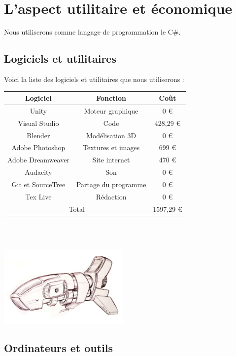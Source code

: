 \documentclass[10pt, titlepage]{report}
\begin{document}
\chapter{L'aspect utilitaire et économique}

Nous utiliserons comme langage de programmation le C\#.

\section{Logiciels et utilitaires}

Voici la liste des logiciels et utilitaires que nous utiliserons :\\

\begin{tabular}{|c|c|c|}
\hline
Logiciel & Fonction & Coût\\
\hline
Unity & Moteur graphique & 0 \euro\\
\hline
Visual Studio & Code & 428,29 \euro\\
\hline
Blender & Modélisation 3D & 0 \euro\\
\hline
Adobe Photoshop & Textures et images & 699 \euro\\
\hline
Adobe Dreamweaver & Site internet & 470 \euro\\
\hline
Audacity & Son & 0 \euro\\
\hline
Git et SourceTree & Partage du programme & 0 \euro\\
\hline
Tex Live & Rédaction & 0 \euro\\
\hline
\multicolumn{2}{|c|}{Total } & 1597,29 \euro\\
\hline
\end{tabular}\\
\\

\begin{center}
\includegraphics[height=4cm, width=6.4cm]{b.jpg}
\end{center}

\section{Ordinateurs et outils}
\end{document}
